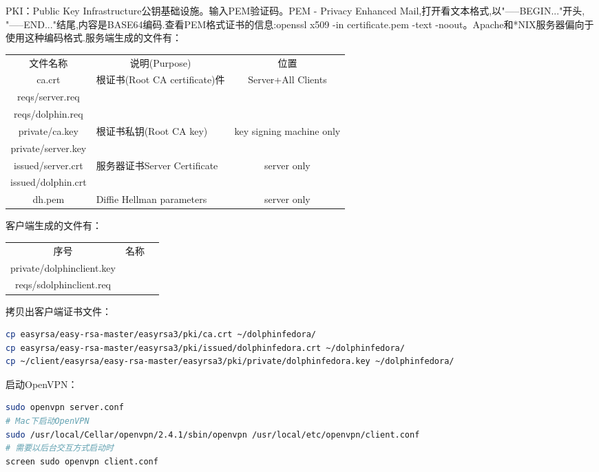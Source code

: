\documentclass[12pt]{book}
\numberwithin{dummy}{section}
\theoremstyle{ocrenumbox}
\theoremstyle{blacknumex}
\theoremstyle{blacknumbox}
\theoremstyle{ocrenum}
\begin{document}
PKI：Public Key Infrastructure公钥基础设施。输入PEM验证码。PEM - Privacy Enhanced Mail,打开看文本格式,以"-----BEGIN..."开头, "-----END..."结尾,内容是BASE64编码.查看PEM格式证书的信息:openssl x509 -in certificate.pem -text -noout。Apache和*NIX服务器偏向于使用这种编码格式.服务端生成的文件有：

\begin{tabular}{|c|p{5cm}|c|}
	\hline
	\multirow{1}{*}{文件名称}
	& \multicolumn{1}{c|}{说明(Purpose)} 
	& \multicolumn{1}{c|}{位置} \\			
	\cline{1-3}
	ca.crt  & 根证书(Root CA certificate)件 & Server+All Clients	\\
	\hline
	reqs/server.req  & &\\
	\hline
	reqs/dolphin.req  & &\\
	\hline
	private/ca.key & 根证书私钥(Root CA key) & key signing machine only\\
	\hline
	private/server.key && \\
	\hline
	issued/server.crt & 服务器证书Server Certificate & server only\\
	\hline
	issued/dolphin.crt && \\
	\hline
	dh.pem & Diffie Hellman parameters & server only \\
	\hline
\end{tabular}

客户端生成的文件有：

\begin{tabular}{|c|p{8cm}|c|}
	\hline
	\multirow{1}{*}{序号}
	& \multicolumn{1}{c|}{名称}  \\			
	\cline{1-2}
	private/dolphinclient.key  & \\
	\hline
	reqs/sdolphinclient.req & \\
	\hline
\end{tabular}

拷贝出客户端证书文件：

\begin{lstlisting}[language=Bash]
cp easyrsa/easy-rsa-master/easyrsa3/pki/ca.crt ~/dolphinfedora/
cp easyrsa/easy-rsa-master/easyrsa3/pki/issued/dolphinfedora.crt ~/dolphinfedora/
cp ~/client/easyrsa/easy-rsa-master/easyrsa3/pki/private/dolphinfedora.key ~/dolphinfedora/
\end{lstlisting}


启动OpenVPN：

\begin{lstlisting}[language=Bash]
sudo openvpn server.conf
# Mac下启动OpenVPN
sudo /usr/local/Cellar/openvpn/2.4.1/sbin/openvpn /usr/local/etc/openvpn/client.conf
# 需要以后台交互方式启动时
screen sudo openvpn client.conf
\end{lstlisting}
\end{document}
